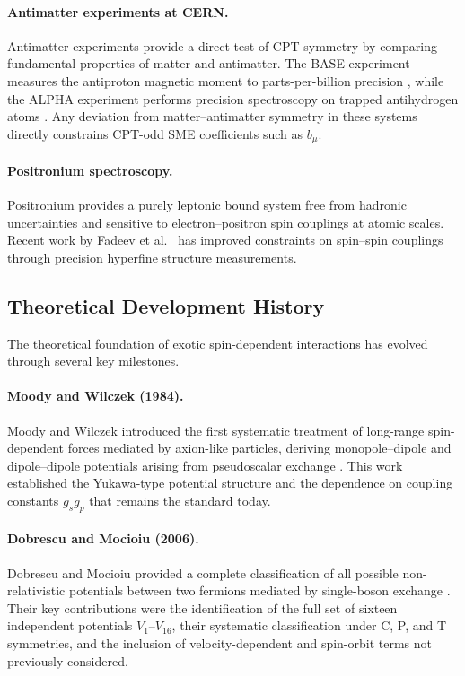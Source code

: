 \documentclass[12pt,a4paper]{report}
\begin{document}
\paragraph{Antimatter experiments at CERN.}
Antimatter experiments provide a direct test of CPT symmetry by comparing
fundamental properties of matter and antimatter. The BASE experiment measures
the antiproton magnetic moment to parts-per-billion precision
\cite{Smorra2017}, while the ALPHA experiment performs precision spectroscopy on
trapped antihydrogen atoms \cite{Ahmadi2017}. Any deviation from matter--antimatter
symmetry in these systems directly constrains CPT-odd SME coefficients such as
$b_{\mu}$.

\paragraph{Positronium spectroscopy.}
Positronium provides a purely leptonic bound system free from hadronic
uncertainties and sensitive to electron--positron spin couplings at atomic
scales. Recent work by Fadeev et al.\ \cite{Fadeev2022} has improved
constraints on spin--spin couplings through precision hyperfine structure
measurements.

\subsection{Theoretical Development History}

The theoretical foundation of exotic spin-dependent interactions has evolved
through several key milestones.

\paragraph{Moody and Wilczek (1984).}
Moody and Wilczek introduced the first systematic treatment of long-range
spin-dependent forces mediated by axion-like particles, deriving monopole--dipole
and dipole--dipole potentials arising from pseudoscalar exchange \cite{MoodyWilczek1984}.
This work established the Yukawa-type potential structure and the dependence on
coupling constants $g_{s}g_{p}$ that remains the standard today.

\paragraph{Dobrescu and Mocioiu (2006).}
Dobrescu and Mocioiu provided a complete classification of all possible
non-relativistic potentials between two fermions mediated by single-boson
exchange \cite{Dobrescu2006}. Their key contributions were the identification of
the full set of sixteen independent potentials $V_{1}$--$V_{16}$, their
systematic classification under C, P, and T symmetries, and the inclusion of
velocity-dependent and spin-orbit terms not previously considered.
\end{document}
